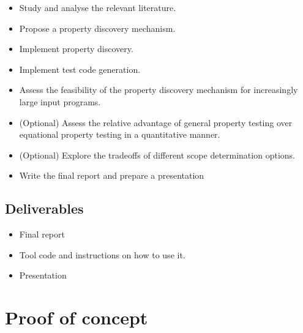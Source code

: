 \documentclass[a4paper, 11pt, onepage]{article}
\begin{document}
\begin{itemize}
  \item Study and analyse the relevant literature.
  \item Propose a property discovery mechanism.
  \item Implement property discovery.
  \item Implement test code generation.
  \item Assess the feasibility of the property discovery mechanism for increasingly large input programs.
  \item (Optional) Assess the relative advantage of general property testing over equational property testing in a quantitative manner.
  \item (Optional) Explore the tradeoffs of different scope determination options.
  \item Write the final report and prepare a presentation
\end{itemize}


\subsection{Deliverables}

\begin{itemize}
  \item Final report
  \item Tool code and instructions on how to use it.
  \item Presentation
\end{itemize}





\newpage
\appendix

\section{Proof of concept}

\label{app:poc}
\inputminted{Haskell}{poc.hs}
\end{document}
